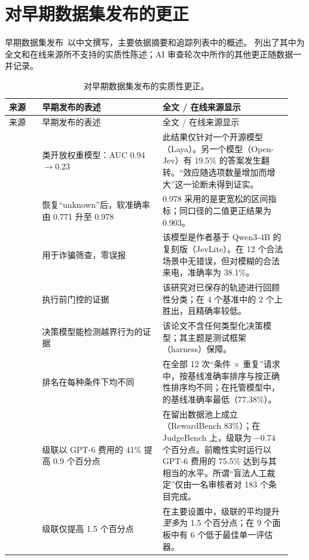 \section{对早期数据集发布的更正}
\label{app:corrections}

早期数据集发布~\cite{survey01}以中文撰写，主要依据摘要和追踪列表中的概述。
 列出了其中为全文和在线来源所不支持的实质性陈述；AI 审查轮次中所作的其他更正随数据一并记录。

\begingroup
\small
\renewcommand{\arraystretch}{1.2}
\begin{longtable}{@{}p{0.11\linewidth}p{0.40\linewidth}p{0.43\linewidth}@{}}
\caption{对早期数据集发布的实质性更正。}\label{tab:corrections}\\
\toprule
来源 & 早期发布的表述 & 全文 / 在线来源显示 \\
\midrule
\endfirsthead
\toprule
来源 & 早期发布的表述 & 全文 / 在线来源显示 \\
\midrule
\endhead
\bottomrule
\endfoot
\cite{arx26758} & 类\jev{}开放权重模型：AUC 0.94$\to$0.23 & 此结果仅针对一个开源模型（Laya）。另一个模型（Open-Jev）有 19.5\% 的答案发生翻转。“效应随选项数量增加而增大”这一论断未得到证实。 \\
\cite{arx35342} & 恢复“unknown”后，软准确率由 0.771 升至 0.978 & 0.978 采用的是更宽松的区间指标；同口径的二值更正结果为 0.903。 \\
\cite{arx23959} & \jev{}用于诈骗筛查，零误报 & 该模型是作者基于 Qwen3-4B 的复刻版（JevLite）。在 12 个合法场景中无错误，但对模糊的合法来电，准确率为 38.1\%。 \\
\cite{arx34862} & 执行前门控的证据 & 该研究对已保存的轨迹进行回顾性分类；\jev{}在 4 个基准中的 2 个上胜出，且精确率较低。 \\
\cite{arx22664} & 决策模型能检测越界行为的证据 & 该论文不含任何类型化决策模型；其主题是测试框架（harness）保障。 \\
\cite{arx27678} & 排名在每种条件下均不同 & 在全部 12 次“条件 × 重复”请求中，按基线准确率排序与按正确性排序均不同；在托管模型中，\jev{}的基线准确率最低（77.38\%）。 \\
\cite{arx26550} & 级联以 GPT-6 费用的 41\% 提高 0.9 个百分点 & 在留出数据池上成立（RewardBench 83\%）；在 JudgeBench 上，级联为 $-0.74$ 个百分点。前瞻性实时运行以 GPT-6 费用的 75.5\% 达到与其相当的水平。所谓“盲法人工裁定”仅由一名审核者对 183 个条目完成。 \\
\cite{arx29769} & 级联仅提高 1.5 个百分点 & 在主要设置中，级联的平均提升\emph{至多}为 1.5 个百分点；在 9 个面板中有 6 个低于最佳单一评估器。 \\

\end{longtable}

